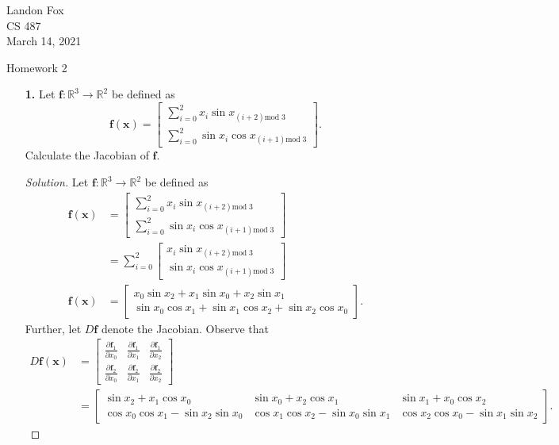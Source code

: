 \documentclass[ 12pt ]{article}
\begin{document}
\noindent Landon Fox \\
\noindent CS 487 \\
\noindent March 14, 2021

\begin{center}
	\Large Homework 2
\end{center}

\begin{enumerate}
	\item[\textbf{1.}] Let $\textbf{f} : \mathbb{R}^3 \to \mathbb{R}^2$ be defined as $$\textbf{f}(\textbf{x}) = \begin{bmatrix} \sum_{i=0}^2 x_i \sin x_{(i+2)\mathrm{mod}\;3} \\[6pt]
		\sum_{i=0}^2 \sin x_i \cos x_{(i+1)\mathrm{mod}\;3}\end{bmatrix}.$$ Calculate the Jacobian of $\textbf{f}$.

		\begin{proof}[Solution]
			Let $\textbf{f} : \mathbb{R}^3 \to \mathbb{R}^2$ be defined as
			\begin{align*}
				\textbf{f}(\textbf{x}) &= \begin{bmatrix} \sum_{i=0}^2 x_i \sin x_{(i+2)\mathrm{mod}\;3} \\[6pt] \sum_{i=0}^2 \sin x_i \cos x_{(i+1)\mathrm{mod}\;3} \end{bmatrix} \\
				&= \sum_{i=0}^2 \begin{bmatrix} x_i \sin x_{(i+2)\mathrm{mod}\;3} \\ \sin x_i \cos x_{(i+1)\mathrm{mod}\;3} \end{bmatrix} \\
				\textbf{f}(\textbf{x}) &= \begin{bmatrix} x_0 \sin x_2 + x_1 \sin x_0 + x_2 \sin x_1 \\ \sin x_0 \cos x_1 + \sin x_1 \cos x_2 + \sin x_2 \cos x_0 \end{bmatrix}.
			\end{align*}
			Further, let $D\textbf{f}$ denote the Jacobian. Observe that
			\begin{align*}
				D\textbf{f}(\textbf{x}) &= \begin{bmatrix} \frac{\partial \textbf{f}_1}{\partial x_0} & \frac{\partial \textbf{f}_1}{\partial x_1} & \frac{\partial \textbf{f}_1}{\partial
					x_2} \\[6pt] \frac{\partial \textbf{f}_2}{\partial x_0} & \frac{\partial \textbf{f}_2}{\partial x_1} & \frac{\partial \textbf{f}_2}{\partial x_2} \end{bmatrix} \\
				&= \begin{bmatrix} \sin x_2 + x_1 \cos x_0 & \sin x_0 + x_2 \cos x_1 & \sin x_1 + x_0 \cos x_2 \\ \cos x_0 \cos x_1 - \sin x_2 \sin x_0 & \cos x_1 \cos x_2 - \sin x_0
					\sin x_1 & \cos x_2 \cos x_0 - \sin x_1 \sin x_2 \end{bmatrix}.
			\end{align*}
		\end{proof}



\end{enumerate}
\end{document}
